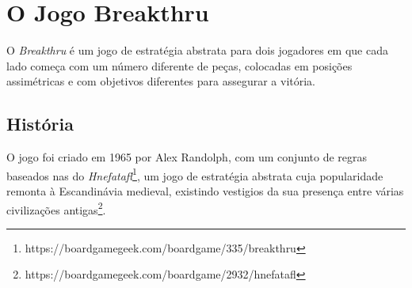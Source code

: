 \documentclass[a4paper]{article}
\begin{document}

\newpage

%
%
%
%
%
%
%


\section{O Jogo Breakthru}
O \emph{Breakthru} é um jogo de estratégia abstrata para dois jogadores em que cada lado começa com um número diferente de peças, colocadas em posições assimétricas e com objetivos diferentes para assegurar a vitória.

\subsection{História}
O jogo foi criado em 1965 por Alex Randolph, com um conjunto de regras baseados nas do \emph{Hnefatafl}\footnote{https://boardgamegeek.com/boardgame/335/breakthru}, um jogo de estratégia abstrata cuja popularidade remonta à Escandinávia medieval, existindo vestigios da sua presença entre várias civilizações antigas\footnote{https://boardgamegeek.com/boardgame/2932/hnefatafl}.
\
\end{document}

